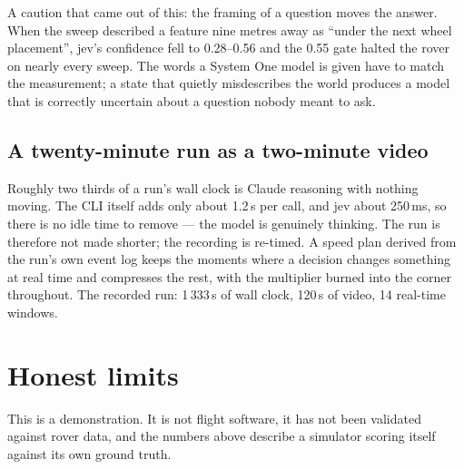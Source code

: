 \documentclass[11pt]{article}
\begin{document}
A caution that came out of this: the framing of a question moves the answer. When the sweep described a feature nine metres away as ``under the next wheel placement'', jev's confidence fell to 0.28--0.56 and the 0.55 gate halted the rover on nearly every sweep. The words a System One model is given have to match the measurement; a state that quietly misdescribes the world produces a model that is correctly uncertain about a question nobody meant to ask.

\subsection{A twenty-minute run as a two-minute video}
Roughly two thirds of a run's wall clock is Claude reasoning with nothing moving. The CLI itself adds only about 1.2\,s per call, and jev about 250\,ms, so there is no idle time to remove --- the model is genuinely thinking. The run is therefore not made shorter; the recording is re-timed. A speed plan derived from the run's own event log keeps the moments where a decision changes something at real time and compresses the rest, with the multiplier burned into the corner throughout. The recorded run: 1\,333\,s of wall clock, 120\,s of video, 14 real-time windows.

\section{Honest limits}
This is a demonstration. It is not flight software, it has not been validated against rover data, and the numbers above describe a simulator scoring itself against its own ground truth.
\end{document}
